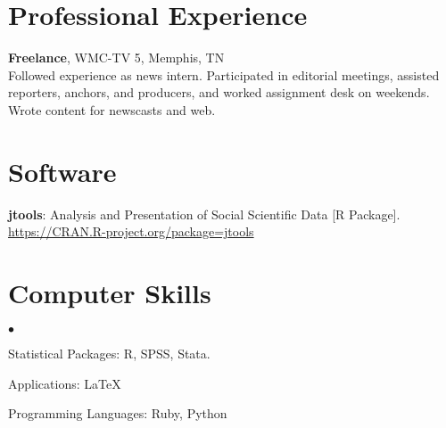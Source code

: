 \documentclass[margin,line]{res}
\newenvironment{list2}{
  \begin{list}{$\bullet$}{%
      \setlength{\itemsep}{0in}
      \setlength{\parsep}{0in} \setlength{\parskip}{0in}
      \setlength{\topsep}{0in} \setlength{\partopsep}{0in} 
      \setlength{\leftmargin}{0.2in}}}{\end{list}}
\begin{document}
\begin{resume}
\section{\sc Professional Experience}
{\bf Freelance}, WMC-TV 5, Memphis, TN\\
Followed experience as news intern. Participated in editorial meetings, assisted reporters, anchors, and producers, and worked assignment desk on weekends. Wrote content for newscasts and web.



\section{\sc Software} 

\textbf{jtools}: Analysis and Presentation of Social Scientific Data [R Package]. \url{https://CRAN.R-project.org/package=jtools}

\section{\sc Computer Skills} 
\begin{list2}
\item Statistical Packages:  R, SPSS, Stata.
\item Applications: \LaTeX
\item Programming Languages: Ruby, Python\\ 
\end{list2}



\end{resume}
\end{document}
